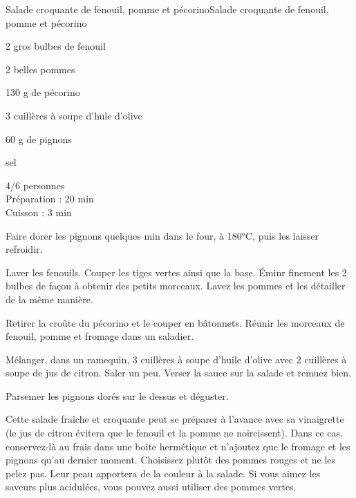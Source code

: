 \begin{recette}{Salade croquante de fenouil, pomme et pécorino}{Salade croquante de fenouil, pomme et pécorino}

\begin{ingredients}
2 gros bulbes de fenouil\par
2 belles pommes\par
130 g de pécorino\par
3 cuillères à soupe d'hule d'olive\par
60 g de pignons\par
sel\par
\end{ingredients}

\begin{infos}
4/6 personnes\\
Préparation : 20 min\\
Cuisson : 3 min\\
\end{infos}

\begin{etapes}
\item Faire dorer les pignons quelques min dans le four, à 180°C, puis les laisser refroidir.
\item Laver les fenouils. Couper les tiges vertes ainsi que la base. Éminr finement les 2 bulbes de façon à obtenir des petits morceaux. Lavez les pommes et les détailler de la même manière.
\item Retirer la croûte du pécorino et le couper en bâtonnets. Réunir les morceaux de fenouil, pomme et fromage dans un saladier.
\item Mélanger, dans un ramequin, 3 cuillères à soupe d'huile d'olive avec 2 cuillères à soupe de jus de citron. Saler un peu. Verser la sauce sur la salade et remuez bien.
\item Parsemer les pignons dorés sur le dessus et déguster.
\end{etapes}

\begin{conseils}
Cette salade fraîche et croquante peut se préparer à l'avance avec sa vinaigrette (le jus de citron évitera que le fenouil et la pomme ne noircissent). Dans ce cas, conservez-là au frais dans une boite hermétique et n'ajoutez que le fromage et les pignons qu'au dernier moment.
Choisissez plutôt des pommes rouges et ne les pelez pas. Leur peau apportera de la couleur à la salade. Si vous aimez les saveurs plus acidulées, vous pouvez aussi utiliser des pommes vertes.
\end{conseils}

\end{recette}